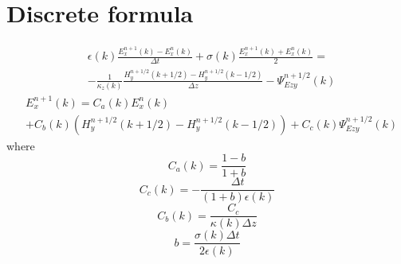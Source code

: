 \documentclass[a4paper,10pt]{article}
\begin{document}
\section{Discrete formula}
\begin{equation}
\begin{aligned}
&\epsilon(k)\frac{E^{n+1}_{x}(k)-E^{n}_{x}(k)}{\Delta t}+\sigma(k)\frac{E^{n+1}_{x}(k)+E^{n}_{x}(k)}{2}=\\
&-\frac{1}{\kappa_z(k)}\frac{H^{n+1/2}_{y}(k+1/2)-H^{n+1/2}_{y}(k-1/2)}{\Delta z}-\Psi_{Ezy}^{n+1/2}(k)
\end{aligned}
\end{equation}
\begin{equation}
\begin{aligned}
&E^{n+1}_{x}(k)=C_{a}(k)E^{n}_{x}(k)\\
&+C_{b}(k)\left(H^{n+1/2}_{y}(k+1/2)-H^{n+1/2}_{y}(k-1/2)\right)+C_{c}(k)\Psi_{Ezy}^{n+1/2}(k)
\end{aligned}
\end{equation}
where 
\begin{equation}
C_{a}(k)=\frac{1-b}{1+b}
\end{equation}
\begin{equation}
C_{c}(k)=-\frac{\Delta t}{(1+b)\epsilon(k)}
\end{equation}
\begin{equation}
C_{b}(k)=\frac{C_{c}}{\kappa(k)\Delta z}
\end{equation}
\begin{equation}
b=\frac{\sigma(k)\Delta t}{2\epsilon(k)}
\end{equation}
\end{document}
